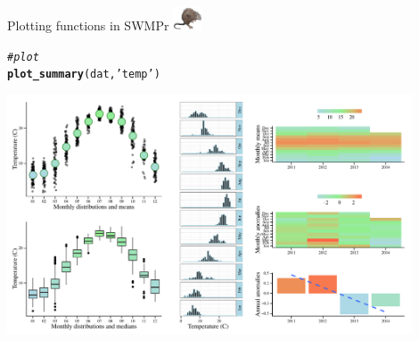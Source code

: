 \documentclass[xcolor=dvipsnames]{beamer}\usepackage[]{graphicx}\usepackage[]{color}
\makeatletter
\newcommand{\hlstr}[1]{\textcolor[rgb]{0.192,0.494,0.8}{#1}}%
\newcommand{\hlcom}[1]{\textcolor[rgb]{0.678,0.584,0.686}{\textit{#1}}}%
\newcommand{\hlstd}[1]{\textcolor[rgb]{0.345,0.345,0.345}{#1}}%
\newcommand{\hlkwd}[1]{\textcolor[rgb]{0.737,0.353,0.396}{\textbf{#1}}}%
\newenvironment{kframe}{%
 \def\at@end@of@kframe{}%
 \ifinner\ifhmode%
  \def\at@end@of@kframe{\end{minipage}}%
  \begin{minipage}{\columnwidth}%
 \fi\fi%
 \def\FrameCommand##1{\hskip\@totalleftmargin \hskip-\fboxsep
 \colorbox{shadecolor}{##1}\hskip-\fboxsep
     \hskip-\linewidth \hskip-\@totalleftmargin \hskip\columnwidth}%
 \MakeFramed {\advance\hsize-\width
   \@totalleftmargin\z@ \linewidth\hsize
   \@setminipage}}%
 {\par\unskip\endMakeFramed%
 \at@end@of@kframe}
\newenvironment{knitrout}{}{} %
\makeatother
\begin{document}
\begin{frame}[fragile, t]{Plotting functions in SWMPr \includegraphics[width = 0.065\textwidth]{imgs/swmprat.png}}

\begin{knitrout}\scriptsize
{}\color{fgcolor}\begin{kframe}
\begin{alltt}
\hlcom{# plot}
\hlkwd{plot_summary}\hlstd{(dat,} \hlstr{'temp'}\hlstd{)}
\end{alltt}
\end{kframe}

{\centering \includegraphics[width=0.9\textwidth]{figure/unnamed-chunk-31-1} 

}



\end{knitrout}
\end{frame}
\end{document}
